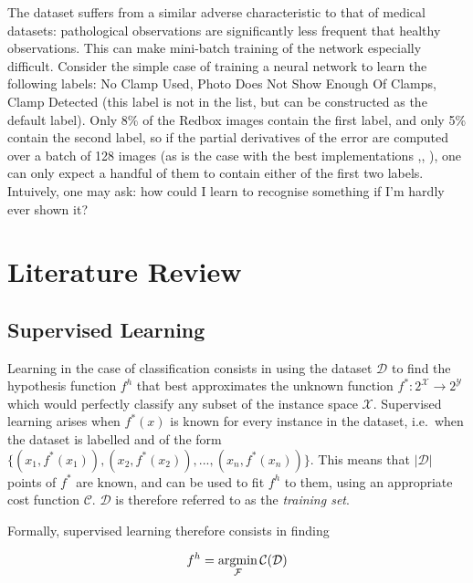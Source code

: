 \documentclass[a4paper,11pt]{article}
\begin{document}
The dataset suffers from a similar adverse characteristic to that of medical datasets: pathological observations are significantly less frequent that healthy observations. This can make mini-batch training of the network especially difficult. Consider the simple case of training a neural network to learn the following labels: No Clamp Used, Photo Does Not Show Enough Of Clamps, Clamp Detected (this label is not in the list, but can be constructed as the default label). Only 8\% of the Redbox images contain the first label, and only 5\% contain the second label, so if the partial derivatives of the error are computed over a batch of 128 images (as is the case with the best implementations \cite{krizhevsky},\cite{transfer-learning}, \cite{decaf}), one can only expect a handful of them to contain either of the first two labels. Intuively, one may ask: how could I learn to recognise something if I'm hardly ever shown it?\\



\clearpage

\section{Literature Review}

\subsection{Supervised Learning}

Learning in the case of classification consists in using the dataset $\mathcal{D}$ to find the hypothesis function $f^{h}$ that best approximates the unknown function $f^{*} : 2^{\mathcal{X}} \rightarrow 2^{\mathcal{Y}}$ which would perfectly classify any subset of the instance space $\mathcal{X}$. Supervised learning arises when $f^{*}(x)$ is known for every instance in the dataset, i.e.\ when the dataset is labelled and of the form $\{(x_{1},f^{*}(x_{1})),(x_{2},f^{*}(x_{2})), ..., (x_{n},f^{*}(x_{n}))\}$. This means that $|\mathcal{D}|$ points of $f^{*}$ are known, and can be used to fit $f^{h}$ to them, using an appropriate cost function $\mathcal{C}$. $\mathcal{D}$ is therefore referred to as the \textit{training set}. 

Formally, supervised learning therefore consists in finding

\begin{equation}
\label{learning: optimisation equation}
  f^{h} = \operatornamewithlimits{argmin}\limits_{\mathcal{F}}\operatorname{\mathcal{C}}(\mathcal{D})
\end{equation}
  
\end{document}
